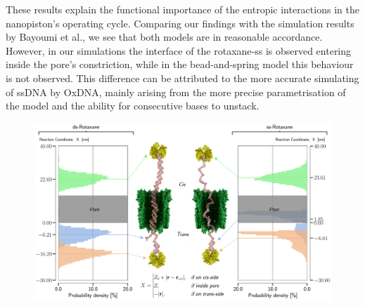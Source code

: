 These results explain the functional importance of the entropic interactions in the
nanopiston's operating cycle. Comparing our findings with the simulation results by
Bayoumi et al., we see that both models are in reasonable accordance. However, in our
simulations the interface of the rotaxane-ss is observed entering inside the pore's
constriction, while in the bead-and-spring model this behaviour is not observed. This
difference can be attributed to the more accurate simulating of ssDNA by OxDNA, mainly
arising from the more precise parametrisation of the model and the ability for
consecutive bases to unstack.

\begin{figure}[ht!]
\begin{center}
  \includegraphics[width=1\textwidth]{Figures/image.png}
   \caption[Conformational fluctuations of the ss- and
ds-rotaxane.]{}
\label{fig:conform}
\end{center}
\end{figure}
